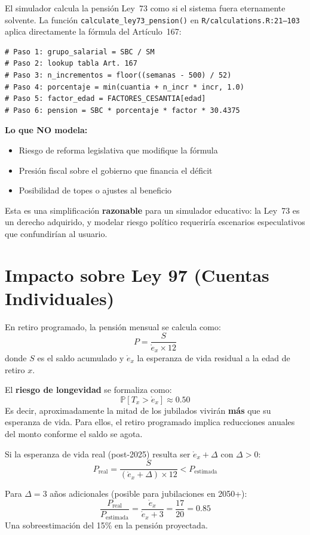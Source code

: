 \documentclass[11pt,a4paper]{report}
\begin{document}
\begin{tcolorbox}[colback=orange!5!white, colframe=orange!75!black, title=\textbf{Aplicaci\'on en C\'odigo: Ley 73 No Modela Sostenibilidad}]
El simulador calcula la pensi\'on Ley~73 como si el sistema fuera eternamente solvente. La funci\'on \texttt{calculate\_ley73\_pension()} en \texttt{R/calculations.R:21--103} aplica directamente la f\'ormula del Art\'iculo~167:

\begin{lstlisting}[caption={Estructura de calculate\_ley73\_pension()}]
# Paso 1: grupo_salarial = SBC / SM
# Paso 2: lookup tabla Art. 167
# Paso 3: n_incrementos = floor((semanas - 500) / 52)
# Paso 4: porcentaje = min(cuantia + n_incr * incr, 1.0)
# Paso 5: factor_edad = FACTORES_CESANTIA[edad]
# Paso 6: pension = SBC * porcentaje * factor * 30.4375
\end{lstlisting}

\textbf{Lo que NO modela:}
\begin{itemize}
  \item Riesgo de reforma legislativa que modifique la f\'ormula
  \item Presi\'on fiscal sobre el gobierno que financia el d\'eficit
  \item Posibilidad de topes o ajustes al beneficio
\end{itemize}

Esta es una simplificaci\'on \textbf{razonable} para un simulador educativo: la Ley~73 es un derecho adquirido, y modelar riesgo pol\'itico requerir\'ia escenarios especulativos que confundir\'ian al usuario.
\end{tcolorbox}


\section{Impacto sobre Ley 97 (Cuentas Individuales)}

\begin{tcolorbox}[colback=blue!5!white, colframe=blue!75!black, title=\textbf{Definici\'on Formal: Retiro Programado y Riesgo de Longevidad}]
En retiro programado, la pensi\'on mensual se calcula como:
\[
  P = \frac{S}{\mathring{e}_x \times 12}
\]
donde $S$ es el saldo acumulado y $\mathring{e}_x$ la esperanza de vida residual a la edad de retiro $x$.

El \textbf{riesgo de longevidad} se formaliza como:
\[
  \mathbb{P}[T_x > \mathring{e}_x] \approx 0.50
\]
Es decir, aproximadamente la mitad de los jubilados vivir\'an \textbf{m\'as} que su esperanza de vida. Para ellos, el retiro programado implica reducciones anuales del monto conforme el saldo se agota.

Si la esperanza de vida real (post-2025) resulta ser $\mathring{e}_x + \Delta$ con $\Delta > 0$:
\[
  P_{\text{real}} = \frac{S}{(\mathring{e}_x + \Delta) \times 12} < P_{\text{estimada}}
\]

Para $\Delta = 3$ a\~nos adicionales (posible para jubilaciones en 2050+):
\[
  \frac{P_{\text{real}}}{P_{\text{estimada}}} = \frac{\mathring{e}_x}{\mathring{e}_x + 3} = \frac{17}{20} = 0.85
\]
Una sobreestimaci\'on del 15\% en la pensi\'on proyectada.
\end{tcolorbox}
\end{document}
